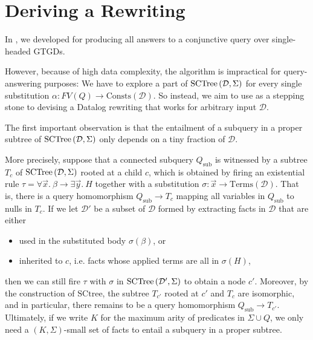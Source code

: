 \documentclass[12pt]{report}
\theoremstyle{plain}
\theoremstyle{definition}
\def\Consts{{\mathrm{Consts}}}
\def\Terms{{\mathrm{Terms}}}
\newcommand{\SCTree}[2]{\ensuremath{\normalfont{\textrm{SCTree}} \left( #1, #2 \right)}}
\begin{document}
\newpage
\chapter{Deriving a Rewriting}\label{deriving-a-rewriting}

In , we developed  for producing all answers to a conjunctive query over single-headed GTGDs.

However, because of high data complexity, the algorithm is impractical for query-answering purposes: We have to explore a part of $\SCTree{\mathcal{D}}{\Sigma}$ for every single substitution $\alpha: FV(Q) \rightarrow \Consts(\mathcal{D})$. So instead, we aim to use  as a stepping stone to devising a Datalog rewriting that works for arbitrary input $\mathcal{D}$.

The first important observation is that the entailment of a subquery in a proper subtree of $\SCTree{\mathcal{D}}{\Sigma}$ only depends on a tiny fraction of $\mathcal{D}$.

More precisely, suppose that a connected subquery $Q_\mathrm{sub}$ is witnessed by a subtree $T_c$ of $\SCTree{\mathcal{D}}{\Sigma}$ rooted at a child $c$, which is obtained by firing an existential rule $\tau = \forall \vec{x}.\ \beta \rightarrow \exists \vec{y}.\ H$ together with a substitution $\sigma: \vec{x} \rightarrow \Terms(\mathcal{D})$. That is, there is a query homomorphism $Q_\mathrm{sub} \rightarrow T_c$ mapping all variables in $Q_\mathrm{sub}$ to nulls in $T_c$. If we let $\mathcal{D'}$ be a subset of $\mathcal{D}$ formed by extracting facts in $\mathcal{D}$ that are either
\begin{itemize}
  \item used in the substituted body $\sigma(\beta)$, or
  \item inherited to $c$, i.e. facts whose applied terms are all in $\sigma(H)$,
\end{itemize}
then we can still fire $\tau$ with $\sigma$ in $\SCTree{\mathcal{D'}}{\Sigma}$ to obtain a node $c'$. Moreover, by the construction of $\mathrm{SCtree}$, the subtree $T_{c'}$ rooted at $c'$ and $T_c$ are isomorphic, and in particular, there remains to be a query homomorphism $Q_\mathrm{sub} \rightarrow T_{c'}$. Ultimately, if we write $K$ for the maximum arity of predicates in $\Sigma \cup Q$, we only need a $(K, \Sigma)$-small set of facts to entail a subquery in a proper subtree.
\end{document}
